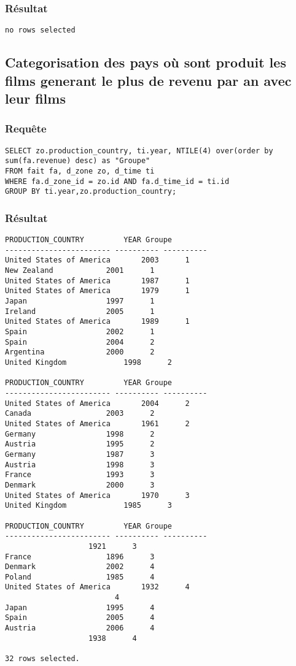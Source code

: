 \subsubsection{Résultat}
\begin{lstlisting}
no rows selected

\end{lstlisting}

\subsection{Categorisation des pays où sont produit les films generant le plus de revenu par an avec leur films}
\subsubsection{Requête}
\begin{lstlisting}
SELECT zo.production_country, ti.year, NTILE(4) over(order by sum(fa.revenue) desc) as "Groupe"
FROM fait fa, d_zone zo, d_time ti
WHERE fa.d_zone_id = zo.id AND fa.d_time_id = ti.id
GROUP BY ti.year,zo.production_country;

\end{lstlisting}
\subsubsection{Résultat}
\begin{lstlisting}
PRODUCTION_COUNTRY	       YEAR	Groupe
------------------------ ---------- ----------
United States of America       2003	     1
New Zealand		       2001	     1
United States of America       1987	     1
United States of America       1979	     1
Japan			       1997	     1
Ireland 		       2005	     1
United States of America       1989	     1
Spain			       2002	     1
Spain			       2004	     2
Argentina		       2000	     2
United Kingdom		       1998	     2

PRODUCTION_COUNTRY	       YEAR	Groupe
------------------------ ---------- ----------
United States of America       2004	     2
Canada			       2003	     2
United States of America       1961	     2
Germany 		       1998	     2
Austria 		       1995	     2
Germany 		       1987	     3
Austria 		       1998	     3
France			       1993	     3
Denmark 		       2000	     3
United States of America       1970	     3
United Kingdom		       1985	     3

PRODUCTION_COUNTRY	       YEAR	Groupe
------------------------ ---------- ----------
			       1921	     3
France			       1896	     3
Denmark 		       2002	     4
Poland			       1985	     4
United States of America       1932	     4
					     4
Japan			       1995	     4
Spain			       2005	     4
Austria 		       2006	     4
			       1938	     4

32 rows selected.

\end{lstlisting}
